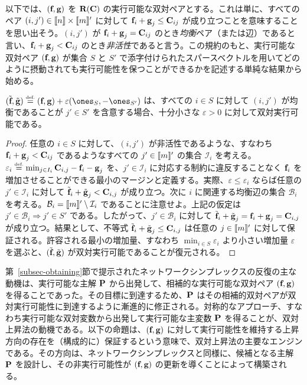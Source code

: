 以下では、$(\fD,\gD)$ を $\PotentialsD(\C)$ の実行可能な双対ペアとする。これは単に、すべてのペア $(i,j')\in\range{n}\times\range{m}'$ に対して $\fD_i+\gD_j\leq\C_{ij}$ が成り立つことを意味することを思い出そう。$(i,j')$ が $\fD_i+\gD_j=\C_{ij}$ のとき\emph{均衡}ペア（または辺）であると言い、$\fD_i+\gD_j<\C_{ij}$ のとき\emph{非活性}であると言う。この規約のもと、実行可能な双対ペア $(\fD,\gD)$ が集合 $S$ と $S'$ で添字付けられたスパースベクトルを用いてどのように摂動されても実行可能性を保つことができるかを記述する単純な結果から始める。

\begin{prop}\label{prop-feasibility-dual-pair}
$(\tilde{\fD},\tilde{\gD})\eqdef(\fD,\gD)+\varepsilon(\ones_S,-\ones_{S'})$ は、すべての $i\in S$ に対して $(i,j')$ が均衡であることが $j'\in S'$ を含意する場合、十分小さな $\varepsilon>0$ に対して双対実行可能である。
\end{prop}
\begin{proof}
任意の $i\in S$ に対して、$(i,j')$ が非活性であるような、すなわち $\fD_i+\gD_j<\C_{ij}$ であるようなすべての $j'\in\range{m}'$ の集合 $\mathcal{I}_{i}$ を考える。$\varepsilon_i \eqdef \min_{j\in I_{i}} \C_{i,j}-\fD_i-\gD_j$ を、$j'\in \mathcal{I}_i$ に対応する制約に違反することなく $\fD_i$ を増加させることができる最小のマージンと定義する。実際、$\varepsilon\leq \varepsilon_i$ ならば任意の $j'\in \mathcal{I}_i$ に対して $\tilde{\fD}_i+\tilde{\gD}_j<\C_{i,j}$ が成り立つ。次に $i$ に関連する均衡辺の集合 $\mathcal{B}_i$ を考える。$\mathcal{B}_i=\range{m}'\setminus \mathcal{I}_i$ であることに注意せよ。上記の仮定は $j'\in\mathcal{B}_i\Rightarrow j'\in S'$ である。したがって、$j'\in\mathcal{B}_i$ に対して $\tilde{\fD}_i+\tilde{\gD}_j=\fD_i+\gD_j=\C_{i,j}$ が成り立つ。結果として、不等式 $\tilde{\fD}_i+\tilde{\gD}_j\leq \C_{i,j}$ は任意の $j\in \range{m}'$ に対して保証される。許容される最小の増加量、すなわち $\min_{i\in S} \varepsilon_i$ より小さい増加量 $\varepsilon$ を選ぶと、$(\tilde{\fD},\tilde{\gD})$ が双対実行可能であることが復元される。
\end{proof}

第~\ref{subsec-obtaining}節で提示されたネットワークシンプレックスの反復の主な動機は、実行可能な主解 $\P$ から出発して、相補的な実行可能な双対ペア $(\fD,\gD)$ を得ることであった。その目標に到達するため、$\P$ はその相補的双対ペアが双対実行可能性に到達するように漸進的に修正される。対称的なアプローチ、すなわち実行可能な双対変数から出発して実行可能な主変数 $\P$ を得ることが、双対上昇法の動機である。以下の命題は、$(\fD,\gD)$ に対して実行可能性を維持する上昇方向の存在を（構成的に）保証するという意味で、双対上昇法の主要なエンジンである。その方向は、ネットワークシンプレックスと同様に、候補となる主解 $\P$ を設計し、その非実行可能性が $(\fD,\gD)$ の更新を導くことによって構築される。

